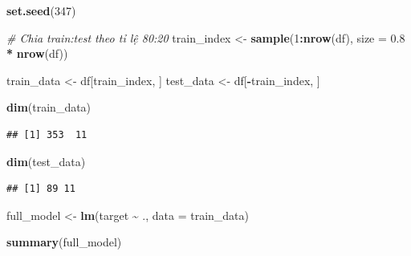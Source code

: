 \documentclass[
]{article}
\newenvironment{Shaded}{\begin{snugshade}}{\end{snugshade}}
\newcommand{\AttributeTok}[1]{\textcolor[rgb]{0.13,0.29,0.53}{#1}}
\newcommand{\CommentTok}[1]{\textcolor[rgb]{0.56,0.35,0.01}{\textit{#1}}}
\newcommand{\DecValTok}[1]{\textcolor[rgb]{0.00,0.00,0.81}{#1}}
\newcommand{\FloatTok}[1]{\textcolor[rgb]{0.00,0.00,0.81}{#1}}
\newcommand{\FunctionTok}[1]{\textcolor[rgb]{0.13,0.29,0.53}{\textbf{#1}}}
\newcommand{\NormalTok}[1]{#1}
\newcommand{\OtherTok}[1]{\textcolor[rgb]{0.56,0.35,0.01}{#1}}
\newcommand{\SpecialCharTok}[1]{\textcolor[rgb]{0.81,0.36,0.00}{\textbf{#1}}}
\begin{document}
\begin{Shaded}
\begin{Highlighting}[]
\FunctionTok{set.seed}\NormalTok{(}\DecValTok{347}\NormalTok{)}

\CommentTok{\# Chia train:test theo tỉ lệ 80:20}
\NormalTok{train\_index }\OtherTok{\textless{}{-}} \FunctionTok{sample}\NormalTok{(}\DecValTok{1}\SpecialCharTok{:}\FunctionTok{nrow}\NormalTok{(df), }\AttributeTok{size =} \FloatTok{0.8} \SpecialCharTok{*} \FunctionTok{nrow}\NormalTok{(df))}

\NormalTok{train\_data }\OtherTok{\textless{}{-}}\NormalTok{ df[train\_index, ]}
\NormalTok{test\_data  }\OtherTok{\textless{}{-}}\NormalTok{ df[}\SpecialCharTok{{-}}\NormalTok{train\_index, ]}

\FunctionTok{dim}\NormalTok{(train\_data)}
\end{Highlighting}
\end{Shaded}

\begin{verbatim}
## [1] 353  11
\end{verbatim}

\begin{Shaded}
\begin{Highlighting}[]
\FunctionTok{dim}\NormalTok{(test\_data)}
\end{Highlighting}
\end{Shaded}

\begin{verbatim}
## [1] 89 11
\end{verbatim}

\begin{Shaded}
\begin{Highlighting}[]
\NormalTok{full\_model }\OtherTok{\textless{}{-}} \FunctionTok{lm}\NormalTok{(target }\SpecialCharTok{\textasciitilde{}}\NormalTok{ ., }\AttributeTok{data =}\NormalTok{ train\_data)}

\FunctionTok{summary}\NormalTok{(full\_model)}
\end{Highlighting}
\end{Shaded}
\end{document}
